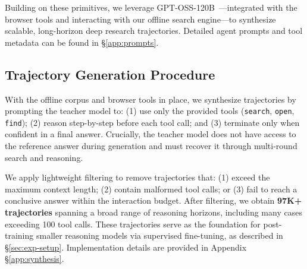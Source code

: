 
Building on these primitives, we leverage GPT-OSS-120B~\citep{agarwal2025gpt}---integrated with the browser tools and interacting with our offline search engine---to synthesize scalable, long-horizon deep research trajectories. Detailed agent prompts and tool metadata can be found in \S\ref{app:prompts}.

\subsection{Trajectory Generation Procedure}
\label{subsec:trajectory_generation}

With the offline corpus and browser tools in place, we synthesize trajectories by prompting the teacher model to: (1) use only the provided tools (\texttt{search}, \texttt{open}, \texttt{find}); (2) reason step-by-step before each tool call; and (3) terminate only when confident in a final answer. Crucially, the teacher model does not have access to the reference answer during generation and must recover it through multi-round search and reasoning.

We apply lightweight filtering to remove trajectories that: (1) exceed the maximum context length; (2) contain malformed tool calls; or (3) fail to reach a conclusive answer within the interaction budget. After filtering, we obtain \textbf{97K+ trajectories} spanning a broad range of reasoning horizons, including many cases exceeding 100 tool calls.
These trajectories serve as the foundation for post-training smaller reasoning models via supervised fine-tuning, as described in \S\ref{sec:exp-setup}. Implementation details are provided in Appendix \S\ref{app:synthesis}.

